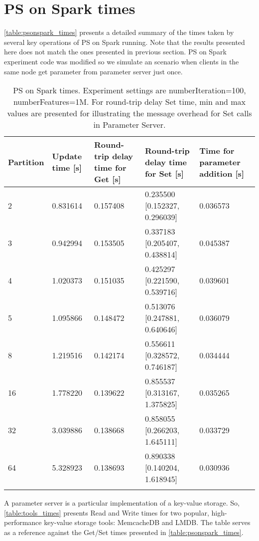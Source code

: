\section*{PS on Spark times}
\label{sec:psonspark-times}

\autoref{table:psonspark_times} presents a detailed summary of the times taken by several key operations of PS on Spark running. Note that the results presented here does not match the ones presented in previous section. PS on Spark experiment code was modified so we simulate an scenario when clients in the same node get parameter from parameter server just once.

\begin{longtable}{m{1.5cm} m{2cm} m{2.5cm} m{5cm} m{2.5cm} }
\hline
Partition & Update time [s] & Round-trip delay time for Get [s] & Round-trip delay time for Set [s] & Time for parameter addition [s] \\
\hline
\rowcolor[gray]{0.9}
2 & 0.831614 & 0.157408 &	0.235500 [0.152327, 0.296039] & 0.036573 \\
3 & 0.942994 & 0.153505 & 0.337183 [0.205407, 0.438814] & 0.045387 \\
\rowcolor[gray]{0.9}
4 & 1.020373 & 0.151035 & 0.425297 [0.221590, 0.539716] & 0.039601 \\
5 & 1.095866 & 0.148472 & 0.513076 [0.247881, 0.640646] & 0.036079 \\
\rowcolor[gray]{0.9}
8 & 1.219516 & 0.142174 & 0.556611 [0.328572, 0.746187] & 0.034444 \\
16 & 1.778220 & 0.139622 & 0.855537 [0.313167, 1.375825] & 0.035265 \\
\rowcolor[gray]{0.9}
32 & 3.039886 & 0.138668 & 0.858055 [0.266203, 1.645111] & 0.033729 \\
64 & 5.328923 & 0.138693 & 0.890338 [0.140204, 1.618945] & 0.030936 \\
\hline
\caption{PS on Spark times. Experiment settings are numberIteration=100, numberFeatures=1M. For round-trip delay Set time, min and max values are presented for illustrating the message overhead for Set calls in Parameter Server.}
\label{table:psonspark_times}
\end{longtable}

A parameter server is a particular implementation of a key-value storage. So, \autoref{table:tools_times} presents Read and Write times for two popular, high-performance key-value storage tools: MemcacheDB and LMDB. The table serves as a reference against the Get/Set times presented in \autoref{table:psonspark_times}. 

